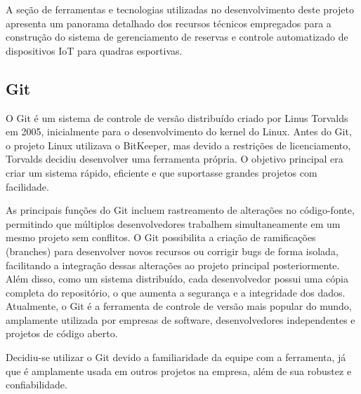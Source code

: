 A seção de ferramentas e tecnologias utilizadas no desenvolvimento deste projeto apresenta um panorama detalhado dos recursos técnicos empregados para a construção do sistema de gerenciamento de reservas e controle automatizado de dispositivos IoT para quadras esportivas. 

\subsection{Git}

O Git é um sistema de controle de versão distribuído criado por Linus Torvalds em 2005, inicialmente para o desenvolvimento do kernel do Linux. Antes do Git, o projeto Linux utilizava o BitKeeper, mas devido a restrições de licenciamento, Torvalds decidiu desenvolver uma ferramenta própria. O objetivo principal era criar um sistema rápido, eficiente e que suportasse grandes projetos com facilidade.

As principais funções do Git incluem rastreamento de alterações no código-fonte, permitindo que múltiplos desenvolvedores trabalhem simultaneamente em um mesmo projeto sem conflitos. O Git possibilita a criação de ramificações (branches) para desenvolver novos recursos ou corrigir bugs de forma isolada, facilitando a integração dessas alterações ao projeto principal posteriormente. Além disso, como um sistema distribuído, cada desenvolvedor possui uma cópia completa do repositório, o que aumenta a segurança e a integridade dos dados. Atualmente, o Git é a ferramenta de controle de versão mais popular do mundo, amplamente utilizada por empresas de software, desenvolvedores independentes e projetos de código aberto.

Decidiu-se utilizar o Git devido a familiaridade da equipe com a ferramenta, já que é amplamente usada em outros projetos na empresa, além de sua robustez e confiabilidade.
 
